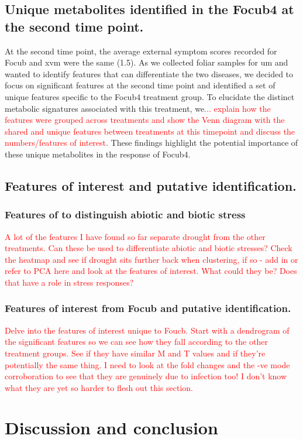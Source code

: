 \subsection{Unique metabolites identified in the \acl{Focub4} at the second time point.}

At the second time point, the average external symptom scores recorded for \ac{Focub} and \ac{xvm} were the same (1.5). As we collected foliar samples for \ac{um} and wanted to identify features that can differentiate the two diseases, we decided to focus on significant features at the second time point and identified a set of unique features specific to the \acl{Focub4} treatment group. To elucidate the distinct metabolic signatures associated with this treatment, we\textcolor{red}{... explain how the features were grouped across treatments and show the Venn diagram with the shared and unique features between treatments at this timepoint and discuss the numbers/features of interest}. These findings highlight the potential importance of these unique metabolites in the response of \acl{Focub4}.

\subsection{Features of interest and putative identification.}

\subsubsection{Features of to distinguish abiotic and biotic stress}

\textcolor{red}{A lot of the features I have found so far separate drought from the other treatments. Can these be used to differentiate abiotic and biotic stresses? Check the heatmap and see if drought sits further back when clustering, if so - add in or refer to PCA here and look at the features of interest. What could they be? Does that have a role in stress responses?}


\subsubsection{Features of interest  from \ac{Focub} and putative identification.}
\textcolor{red}{Delve into the features of interest unique to \ac{Foucb}. Start with a dendrogram of the significant features so we can see how they fall according to the other treatment groups. See if they have similar M and T values and if they're potentially the same thing. I need to look at the fold changes and the -ve mode corroboration to see that they are genuinely due to infection too! I don't know what they are yet so harder to flesh out this section.}

\newpage
\section{Discussion and conclusion}
